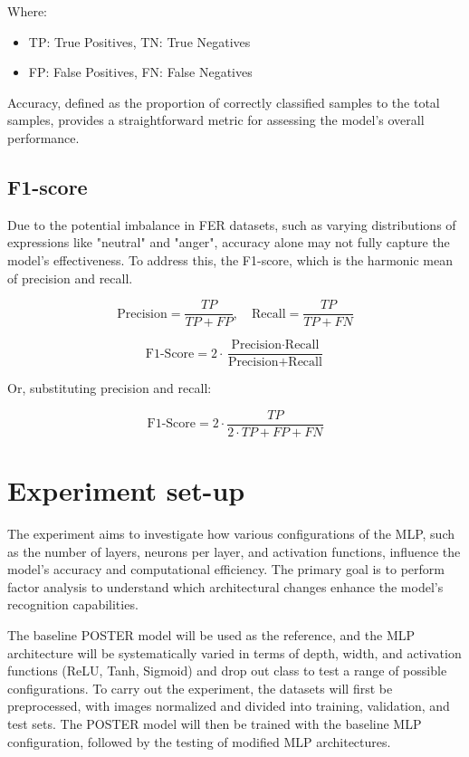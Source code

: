 Where:

\begin{itemize}
\item TP: True Positives, TN: True Negatives
\item FP: False Positives, FN: False Negatives
\end{itemize}

Accuracy, defined as the proportion of correctly classified samples to the total samples, provides a straightforward metric for assessing the model's overall performance.  


\subsection{F1-score}\label{sub:f1-score}

Due to the potential imbalance in FER datasets, such as varying distributions of expressions like "neutral" and "anger", accuracy alone may not fully capture the model's effectiveness. To address this, the F1-score, which is the harmonic mean of precision and recall.


\begin{equation}
\text{Precision} = \frac{TP}{TP + FP}, \quad \text{Recall} = \frac{TP}{TP + FN}
\end{equation}

\begin{equation}
\text{F1-Score} = 2 \cdot \frac{\text{Precision} \cdot \text{Recall}}{\text{Precision} + \text{Recall}}
\end{equation}

Or, substituting precision and recall:

\begin{equation}
\text{F1-Score} = 2 \cdot \frac{TP}{2 \cdot TP + FP + FN}
\end{equation}




\section{Experiment set-up}

The experiment aims to investigate how various configurations of the MLP, such as the number of layers, neurons per layer, and activation functions, influence the model’s accuracy and computational efficiency. The primary goal is to perform factor analysis to understand which architectural changes enhance the model’s recognition capabilities.


The baseline POSTER model will be used as the reference, and the MLP architecture will be systematically varied in terms of depth, width, and activation functions (ReLU, Tanh, Sigmoid) and drop out class to test a range of possible configurations. To carry out the experiment, the datasets will first be preprocessed, with images normalized and divided into training, validation, and test sets. The POSTER model will then be trained with the baseline MLP configuration, followed by the testing of modified MLP architectures. 

